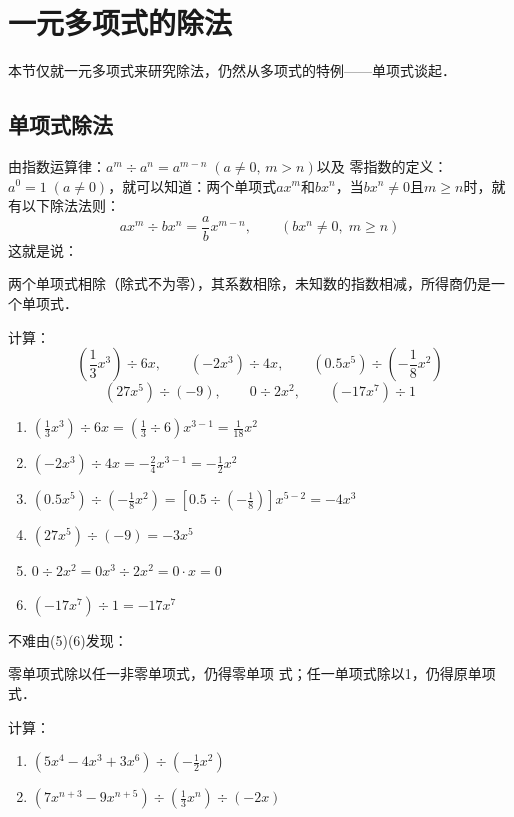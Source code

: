 \section{一元多项式的除法}
本节仅就一元多项式来研究除法，仍然从多项式的特例——单项式谈起．
\subsection{单项式除法}
由指数运算律：$a^m\div a^n=a^{m-n}\; (a\ne 0,\, m>n)$以及
零指数的定义：$a^0=1\; (a\ne 0)$，就可以知道：两个单项式$ax^m$和$bx^n$，当$bx^n\ne 0$且$m\ge n$时，就有以下除法法则：
\[ax^m\div bx^n =\frac{a}{b}x^{m-n},\qquad (bx^n\ne 0,\; m\ge n) \]
这就是说：

\begin{blk}{}
    两个单项式相除（除式不为零），其系数相除，未知数的指数相减，所得商仍是一个单项式．
\end{blk}

\begin{example}
计算：
\[\left(\frac{1}{3}x^3\right)\div 6x,\qquad (-2x^3)\div 4x,\qquad (0.5x^5)\div \left(-\frac{1}{8}x^2\right)\]
\[(27x^5)\div (-9),\qquad 0\div 2x^2,\qquad (-17x^7)\div 1\]
\end{example}

\begin{solution}
    \begin{enumerate}
        \item $\left(\frac{1}{3}x^3\right)\div 6x=\left(\frac{1}{3}\div 6\right)x^{3-1}=\frac{1}{18}x^2$
        \item $(-2x^3)\div 4x=-\frac{2}{4}x^{3-1}=-\frac{1}{2}x^2$
        \item $(0.5x^5)\div \left(-\frac{1}{8}x^2\right)=\left[0.5\div \left(-\frac{1}{8}\right)\right]x^{5-2}=-4x^3$
        \item $(27x^5)\div (-9)=-3x^5$
        \item $0\div 2x^2=0x^3\div 2x^2=0\cdot x=0$
        \item $(-17x^7)\div 1=-17x^7$
    \end{enumerate}
\end{solution}

不难由(5)(6)发现：
\begin{blk}{}
    零单项式除以任一非零单项式，仍得零单项
    式；任一单项式除以1，仍得原单项式．
\end{blk}

\begin{example}
  计算：
\begin{enumerate}
    \item $(5x^4-4x^3+3x^6)\div \left(-\frac{1}{2}x^2\right)$
    \item $(7x^{n+3}-9x^{n+5})\div \left(\frac{1}{3}x^n\right)\div (-2x)$
\end{enumerate}
\end{example}

